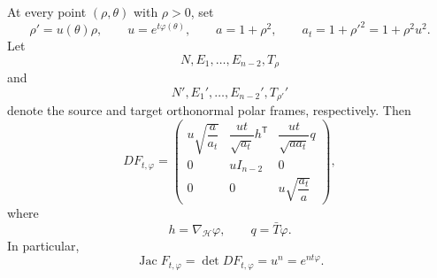 \documentclass[10pt,a4paper]{amsart}
\newcommand{\Jac}{\operatorname{Jac}}
\begin{document}
\begin{proposition}
\label{prop:basic-matrix}
At every point $(\rho,\theta)$ with $\rho>0$, set
\[
\rho'=u(\theta)\rho,
\qquad
u=e^{t\varphi(\theta)},
\qquad
a=1+\rho^{2},
\qquad
a_t=1+\rho'^2=1+\rho^{2}u^{2}.
\]
Let
\[
N,E_{1},\ldots,E_{n-2},T_{\rho}
\]
and
\[
N',E_{1}',\ldots,E_{n-2}',T_{\rho'}'
\]
denote the source and target orthonormal polar frames, respectively.
Then
\[
DF_{t,\varphi}
=
\begin{pmatrix}
u\sqrt{\dfrac{a}{a_t}}
&
\dfrac{ut}{\sqrt{a_t}}h^{\mathsf T}
&
\dfrac{ut}{\sqrt{aa_t}}q
\\[8pt]
0
&
uI_{n-2}
&
0
\\
0
&
0
&
u\sqrt{\dfrac{a_t}{a}}
\end{pmatrix},
\]
where
\[
h=\nabla_{\mathcal H}\varphi,
\qquad
q=\bar T\varphi.
\]
In particular,
\begin{equation}
\Jac F_{t,\varphi}
=
\det DF_{t,\varphi}
=
u^n
=
e^{nt\varphi}.
\label{eq:basic-ambient-jacobian}
\end{equation}
\end{proposition}
\end{document}
